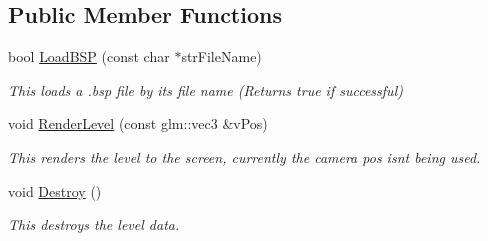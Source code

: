 \subsection*{Public Member Functions}
\begin{DoxyCompactItemize}
\item 
bool \hyperlink{class_b_s_pfile_abfb2664873246b1714ffa17593cb6cf2}{Load\+B\+SP} (const char $\ast$str\+File\+Name)\hypertarget{class_b_s_pfile_abfb2664873246b1714ffa17593cb6cf2}{}\label{class_b_s_pfile_abfb2664873246b1714ffa17593cb6cf2}

\begin{DoxyCompactList}\small\item\em This loads a .bsp file by it\textquotesingle{}s file name (Returns true if successful) \end{DoxyCompactList}\item 
void \hyperlink{class_b_s_pfile_a7b15a3485081c1e8b31209271a68e0a6}{Render\+Level} (const glm\+::vec3 \&v\+Pos)\hypertarget{class_b_s_pfile_a7b15a3485081c1e8b31209271a68e0a6}{}\label{class_b_s_pfile_a7b15a3485081c1e8b31209271a68e0a6}

\begin{DoxyCompactList}\small\item\em This renders the level to the screen, currently the camera pos isn\textquotesingle{}t being used. \end{DoxyCompactList}\item 
void \hyperlink{class_b_s_pfile_a703bd45549f861ea4a84852538b0fcb1}{Destroy} ()\hypertarget{class_b_s_pfile_a703bd45549f861ea4a84852538b0fcb1}{}\label{class_b_s_pfile_a703bd45549f861ea4a84852538b0fcb1}

\begin{DoxyCompactList}\small\item\em This destroys the level data. \end{DoxyCompactList}\end{DoxyCompactItemize}
